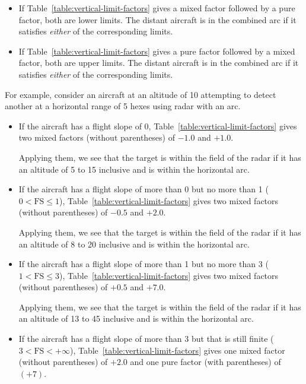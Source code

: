 {\begin{itemize}
\item 
If Table~\ref{table:vertical-limit-factors} gives a mixed factor followed by a pure factor, both are lower limits. The distant aircraft is in the combined arc if it satisfies \emph{either} of the corresponding limits.

\item 
If Table~\ref{table:vertical-limit-factors} gives a pure factor followed by a mixed factor, both are upper limits. The distant aircraft is in the combined arc if it satisfies \emph{either} of the corresponding limits.

\end{itemize}

For example, consider an aircraft at an altitude of 10 attempting to detect another at a horizontal range of 5 hexes using radar with an  arc.
\begin{itemize}
\item
If the aircraft has a flight slope of 0, Table~\ref{table:vertical-limit-factors} gives two mixed factors (without parentheses) of $-1.0$ and $+1.0$. 

Applying them, we see that the target is within the field of the radar if it has an altitude of 5 to 15 inclusive and is within the  horizontal arc.

\item
If the aircraft has a flight slope of more than 0 but no more than 1 ($0 < \mbox{FS} \le 1$), Table~\ref{table:vertical-limit-factors} gives two mixed factors (without parentheses) of $-0.5$ and $+2.0$. 

Applying them, we see that the target is within the field of the radar if it has an altitude of 8 to 20 inclusive and is within the  horizontal arc.

\item
If the aircraft has a flight slope of more than 1 but no more than 3 ($1 < \mbox{FS} \le 3$), Table~\ref{table:vertical-limit-factors} gives two mixed factors (without parentheses) of $+0.5$ and $+7.0$. 

Applying them, we see that the target is within the field of the radar if it has an altitude of 13 to 45 inclusive and is within the  horizontal arc.

\item
If the aircraft has a flight slope of more than 3 but that is still finite ($3 < \mbox{FS} < +\infty$), Table~\ref{table:vertical-limit-factors} gives one mixed factor (without parentheses) of $+2.0$ and one pure factor (with parentheses) of $(+7)$.


\end{itemize}}
